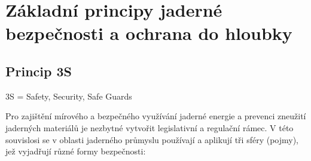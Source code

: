 \section[Jaderná bezpečnost \& ochrana do hloubky]{Základní principy jaderné bezpečnosti a ochrana do hloubky}

\subsection{Princip 3S}

3S = Safety, Security, Safe Guards

Pro zajištění mírového a bezpečného využívání jaderné energie a prevenci zneužití jaderných materiálů je nezbytné vytvořit legislativní a regulační rámec. V této souvislosi se v oblasti jaderného průmyslu používají a aplikují tři sféry (pojmy), jež vyjadřují různé formy bezpečnosti:

